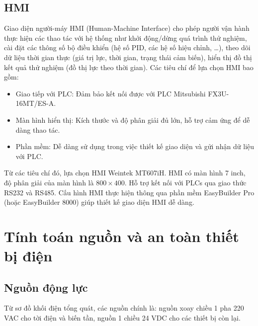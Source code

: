           \subsection{HMI}
               \hspace*{0.6cm}Giao diện người-máy HMI (Human-Machine Interface) cho phép người vận hành thực hiện các thao tác với hệ thống như khởi động/dừng quá trình thử nghiệm, cài đặt các thông số bộ điều khiển (hệ số PID, các hệ số hiệu chỉnh, \dots), theo dõi dữ liệu thời gian thực (giá trị lực, thời gian, trạng thái cảm biến), hiển thị đồ thị kết quả thử nghiệm (đồ thị lực theo thời gian). Các tiêu chí để lựa chọn HMI bao gồm:
               \begin{itemize}
                    \item Giao tiếp với PLC: Đảm bảo kết nối được với PLC Mitsubishi FX3U-16MT/ES-A.
                    \item Màn hình hiển thị: Kích thước và độ phân giải đủ lớn, hỗ trợ cảm ứng để dễ dàng thao tác.
                    \item Phần mềm: Dễ dàng sử dụng trong việc thiết kế giao diện và gửi nhận dữ liệu với PLC. 
               \end{itemize}
               Từ các tiêu chí đó, lựa chọn HMI Weintek MT607iH. HMI có màn hình 7 inch, độ phân giải của màn hình là $800 \times 400$. Hỗ trợ kết nối với PLCs qua giao thức RS232 và RS485. Cấu hình HMI thực hiện thông qua phần mềm EasyBuilder Pro (hoặc EasyBuilder 8000) giúp thiết kế giao diện HMI dễ dàng.
     \section{Tính toán nguồn và an toàn thiết bị điện}
          \subsection{Nguồn động lực}
          \hspace*{0.6cm}Từ sơ đồ khối điện tổng quát, các nguồn chính là: nguồn xoay chiều 1 pha 220 VAC cho tời điện và biến tần, nguồn 1 chiều 24 VDC cho các thiết bị còn lại.
